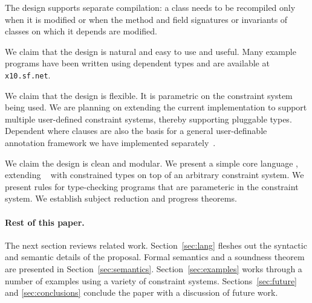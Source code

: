 The design supports separate compilation: a class needs to be
recompiled only when it is modified or when the method
and field signatures or invariants of classes on which it
depends are modified.

We claim that the design is natural and easy to use and useful. Many
example programs have been written using dependent types and are
available at {\tt x10.sf.net}.

We claim that the design is flexible. It is parametric on the
constraint system being used. We are planning on extending the current
implementation to support multiple user-defined constraint systems,
thereby supporting pluggable types. Dependent where clauses are also
the basis for a general user-definable annotation framework we have
implemented separately~\cite{ns07-x10anno}. 

We claim the design is clean and modular. We present a simple core
language \CFJ, extending \FJ{}~\cite{FJ} with constrained types on top
of an arbitrary constraint system. We present rules for type-checking
\CFJ{} programs that are parameteric in the constraint system. 
We establish subject reduction and progress theorems. 

%

\paragraph{Rest of this paper.}

The next section reviews related work.
Section~\ref{sec:lang} fleshes out the syntactic and semantic details of the
proposal.
Formal semantics
and a soundness theorem
are presented in Section~\ref{sec:semantics}.
Section~\ref{sec:examples} works through a number of
examples using a variety of constraint systems.
Sections~\ref{sec:future}
and \ref{sec:conclusions} conclude the paper with a discussion of
future work.


